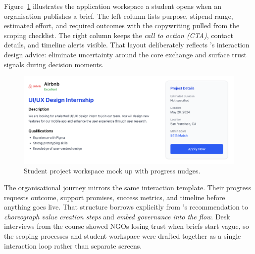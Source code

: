 Figure~\ref{fig:student-view} illustrates the application workspace a student opens when an organisation publishes a brief. The left column lists purpose, stipend range, estimated effort, and required outcomes with the copywriting pulled from the scoping checklist. The right column keeps the \textit{call to action (CTA)}, contact details, and timeline alerts visible. That layout deliberately reflects \citet{Choudary2016}'s interaction design advice: eliminate uncertainty around the core exchange and surface trust signals during decision moments.

\begin{figure}[H]
  \centering
  \includegraphics[width=0.85\linewidth]{figures/Student-Project-View.png}
  \caption{Student project workspace mock up with progress nudges.}
  \label{fig:student-view}
\end{figure}

The organisational journey mirrors the same interaction template. Their progress requests outcome, support promises, success metrics, and timeline before anything goes live. That structure borrows explicitly from \citet{Reillier2017}'s recommendation to \textit{choreograph value creation steps} and \textit{embed governance into the flow}. Desk interviews from the course showed NGOs losing trust when briefs start vague, so the scoping processes and student workspace were drafted together as a single interaction loop rather than separate screens.
